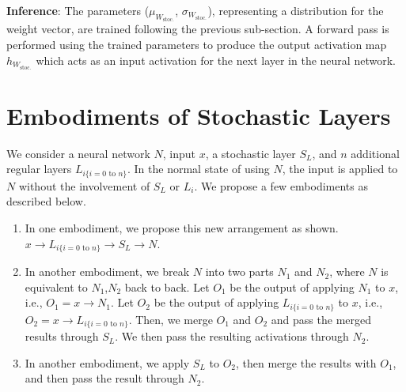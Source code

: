 \documentclass[12pt, letterpaper]{article}
\begin{document}
\textbf{Inference}:
The parameters ($\mu_{W_\mathrm{stoc.}}$, $\sigma_{W_\mathrm{stoc.}}$), representing a distribution for the weight vector, are trained following the previous sub-section.
A forward pass is performed using the trained parameters to produce the output activation map $h_{W_\mathrm{stoc.}}$ which acts as an input activation for the next layer in the neural network.


\section{Embodiments of Stochastic Layers}
We consider a neural network $N$, input $x$, a stochastic layer $S_L$, and $n$ additional regular layers $L_{i\text{\{$i=0$ to $n$\}}}$. In the normal state of using $N$, the input is applied to $N$ without the involvement of $S_L$ or $L_i$. We propose a few embodiments as described below.
\begin{enumerate}
    \item In one embodiment, we propose this new arrangement as shown. $x \rightarrow L_{i\text{\{$i=0$ to $n$\}}} \rightarrow S_L \rightarrow N$.
    \item In another embodiment, we break $N$ into two parts $N_1$ and $N_2$, where $N$ is equivalent to $N_1$,$N_2$ back to back. Let $O_1$ be the output of applying $N_1$ to $x$, i.e., $O_1 = x \rightarrow N_1$. Let $O_2$ be the output of applying $L_{i\text{\{$i=0$ to $n$\}}}$ to $x$, i.e., $O_2 = x \rightarrow L_{i\text{\{$i=0$ to $n$\}}}$. Then, we merge $O_1$ and $O_2$ and pass the merged results through $S_L$. We then pass the resulting activations through $N_2$.
    \item In another embodiment, we apply $S_L$ to $O_2$, then merge the results with $O_1$, and then pass the result through $N_2$.
    
\end{enumerate}
\end{document}
